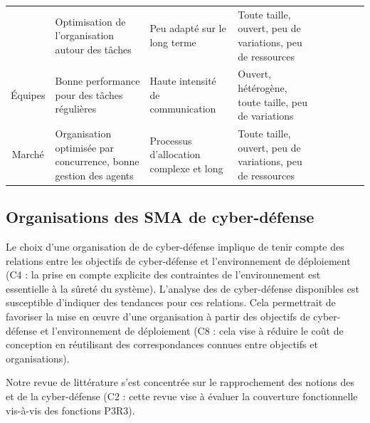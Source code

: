 \begin{table}[t!]
{\begin{tabularx}{\linewidth}
            { Coalition}
             & {  Optimisation de l'organisation autour des tâches}
             & {  Peu adapté sur le long terme}
             & {  Toute taille, ouvert, peu de variations, peu de ressources}
             & {  \cite{carvalho2011evolutionary}}
            \\

            { Équipes}
             & {  Bonne performance pour des tâches régulières}
             & {  Haute intensité de communication}
             & {  Ouvert, hétérogène, toute taille, peu de variations}
             & {  \cite{akandwanaho2018generic}}
            \\

            { Marché}
             & {  Organisation optimisée par concurrence, bonne gestion des agents}
             & {  Processus d'allocation complexe et long}
             & {  Toute taille, ouvert, peu de variations, peu de ressources}
             & {  \cite{demir2021adaptive}}
            \\
            \bottomrule
        \end{tabularx}
    }
    \label{tab:general-overview}
\end{table}


\subsection{Organisations des SMA de cyber-défense}


Le choix d'une organisation de  de cyber-défense implique de tenir compte des relations entre les objectifs de cyber-défense et l'environnement de déploiement (C4 : la prise en compte explicite des contraintes de l’environnement est essentielle à la sûreté du système).
L'analyse des  de cyber-défense disponibles est susceptible d'indiquer des tendances pour ces relations.
Cela permettrait de favoriser la mise en œuvre d'une organisation à partir des objectifs de cyber-défense et l'environnement de déploiement (C8 : cela vise à réduire le coût de conception en réutilisant des correspondances connues entre objectifs et organisations).

Notre revue de littérature s'est concentrée sur le rapprochement des notions des  et de la cyber-défense (C2 : cette revue vise à évaluer la couverture fonctionnelle vis-à-vis des fonctions P3R3).

